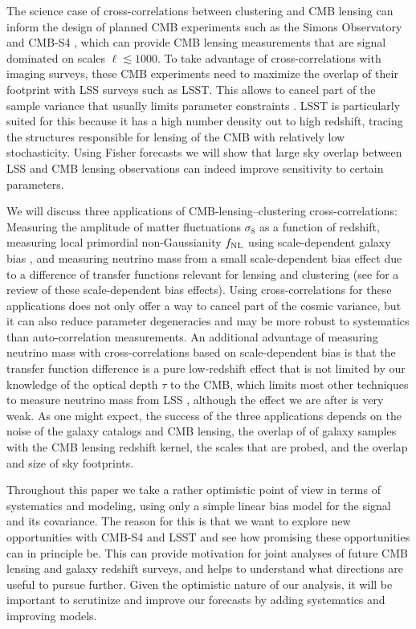 \documentclass[prd,superscriptaddress,floatfix,notitlepage,nofootinbib,reprint]{revtex4-1} %
\begin{document}
The science case of cross-correlations between clustering and CMB lensing can inform the design of
planned CMB experiments such as the Simons Observatory \cite{SimonsObservatory} and CMB-S4 \cite{CMBS4SciBook}, which can provide CMB lensing measurements that are signal dominated on scales $\ell\lesssim 1000$.
To take advantage of cross-correlations with imaging surveys, these CMB experiments need to maximize the overlap of their footprint with LSS surveys such as LSST.
This allows to cancel part of the sample variance that usually limits parameter constraints \cite{Uros0807}. 
LSST is particularly suited for this because it has a high number density out to high redshift, tracing the structures responsible for lensing of the CMB with relatively low stochasticity.
Using Fisher forecasts we will show that large sky overlap between LSS and CMB lensing observations can indeed improve sensitivity to certain parameters. 


We will discuss three applications of CMB-lensing--clustering cross-correlations:
Measuring the amplitude of matter fluctuations $\sigma_8$ as a function of redshift, measuring local primordial non-Gaussianity ${f_\mathrm{NL}}$ using
scale-dependent galaxy bias \cite{Dalal0710}, and measuring neutrino mass from a small scale-dependent bias effect due to a difference of transfer functions relevant for lensing and clustering \cite{Villaescusa-Navarro1311,Castorina1311,LoVerde1405,LoVerde1602}
 (see  for a review of these scale-dependent bias effects).
Using cross-correlations for these applications does not only offer a way to cancel part of the cosmic variance, but it can also reduce parameter degeneracies and may be more robust to systematics than auto-correlation measurements.
An additional advantage of measuring neutrino mass with cross-correlations based on scale-dependent bias is that the transfer function difference is a pure low-redshift effect that is not limited by our knowledge of the optical depth $\tau$ to the CMB, which limits most other techniques to measure neutrino mass from LSS \cite{Allison1509}, although 
the effect we are after is very weak.
As one might expect, the success of the three applications depends on
the noise of the galaxy catalogs and CMB lensing, the overlap of of galaxy samples with the CMB lensing redshift kernel, the scales that are probed, and the overlap and size of sky footprints.


Throughout this paper we take a rather optimistic point of view in terms of systematics and modeling, using only a simple linear bias model for the signal and its covariance. 
The reason for this is that we want to explore new opportunities with CMB-S4 and LSST and see how promising these opportunities can in principle be.
This can provide motivation for joint analyses of future CMB lensing and galaxy redshift surveys, and helps to understand what directions are useful to pursue further.
Given the optimistic nature of our analysis, it will be important to scrutinize and improve our forecasts by adding systematics and improving models.
\end{document}
